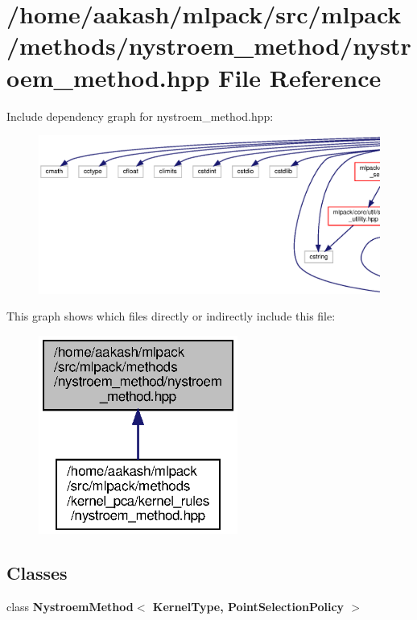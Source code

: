 \section{/home/aakash/mlpack/src/mlpack/methods/nystroem\+\_\+method/nystroem\+\_\+method.hpp File Reference}
\label{nystroem__method_2nystroem__method_8hpp}
Include dependency graph for nystroem\+\_\+method.\+hpp\+:
\nopagebreak
\begin{figure}[H]
\begin{center}
\leavevmode
\includegraphics[width=350pt]{nystroem__method_2nystroem__method_8hpp__incl}
\end{center}
\end{figure}
This graph shows which files directly or indirectly include this file\+:
\nopagebreak
\begin{figure}[H]
\begin{center}
\leavevmode
\includegraphics[width=185pt]{nystroem__method_2nystroem__method_8hpp__dep__incl}
\end{center}
\end{figure}
\subsection*{Classes}
\begin{DoxyCompactItemize}
\item 
class \textbf{ Nystroem\+Method$<$ Kernel\+Type, Point\+Selection\+Policy $>$}
\end{DoxyCompactItemize}
